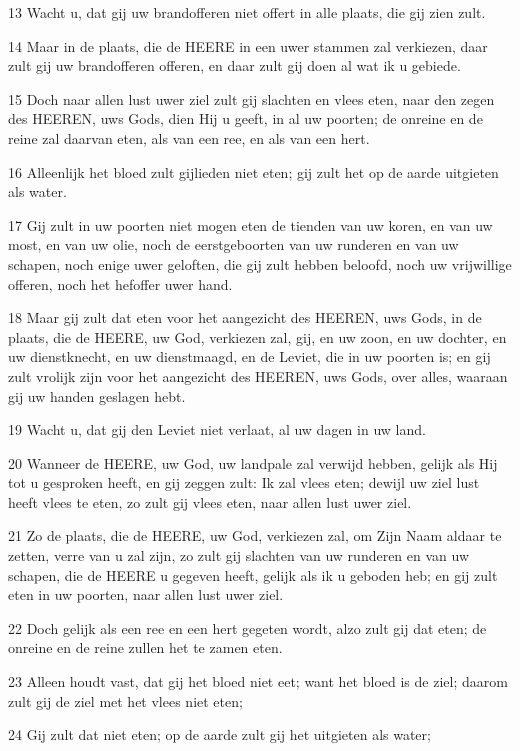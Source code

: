 \par 13 Wacht u, dat gij uw brandofferen niet offert in alle plaats, die gij zien zult.
\par 14 Maar in de plaats, die de HEERE in een uwer stammen zal verkiezen, daar zult gij uw brandofferen offeren, en daar zult gij doen al wat ik u gebiede.
\par 15 Doch naar allen lust uwer ziel zult gij slachten en vlees eten, naar den zegen des HEEREN, uws Gods, dien Hij u geeft, in al uw poorten; de onreine en de reine zal daarvan eten, als van een ree, en als van een hert.
\par 16 Alleenlijk het bloed zult gijlieden niet eten; gij zult het op de aarde uitgieten als water.
\par 17 Gij zult in uw poorten niet mogen eten de tienden van uw koren, en van uw most, en van uw olie, noch de eerstgeboorten van uw runderen en van uw schapen, noch enige uwer geloften, die gij zult hebben beloofd, noch uw vrijwillige offeren, noch het hefoffer uwer hand.
\par 18 Maar gij zult dat eten voor het aangezicht des HEEREN, uws Gods, in de plaats, die de HEERE, uw God, verkiezen zal, gij, en uw zoon, en uw dochter, en uw dienstknecht, en uw dienstmaagd, en de Leviet, die in uw poorten is; en gij zult vrolijk zijn voor het aangezicht des HEEREN, uws Gods, over alles, waaraan gij uw handen geslagen hebt.
\par 19 Wacht u, dat gij den Leviet niet verlaat, al uw dagen in uw land.
\par 20 Wanneer de HEERE, uw God, uw landpale zal verwijd hebben, gelijk als Hij tot u gesproken heeft, en gij zeggen zult: Ik zal vlees eten; dewijl uw ziel lust heeft vlees te eten, zo zult gij vlees eten, naar allen lust uwer ziel.
\par 21 Zo de plaats, die de HEERE, uw God, verkiezen zal, om Zijn Naam aldaar te zetten, verre van u zal zijn, zo zult gij slachten van uw runderen en van uw schapen, die de HEERE u gegeven heeft, gelijk als ik u geboden heb; en gij zult eten in uw poorten, naar allen lust uwer ziel.
\par 22 Doch gelijk als een ree en een hert gegeten wordt, alzo zult gij dat eten; de onreine en de reine zullen het te zamen eten.
\par 23 Alleen houdt vast, dat gij het bloed niet eet; want het bloed is de ziel; daarom zult gij de ziel met het vlees niet eten;
\par 24 Gij zult dat niet eten; op de aarde zult gij het uitgieten als water;
